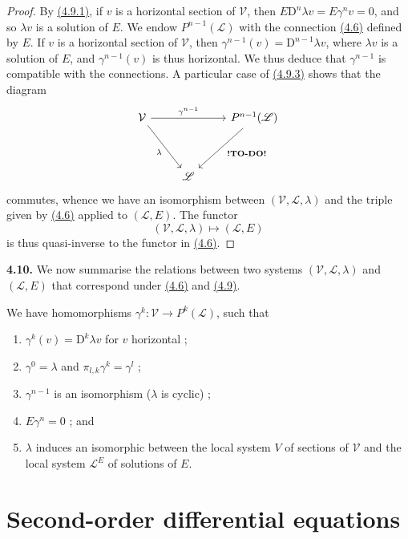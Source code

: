 \documentclass{report}
\newenvironment{rmenv}[1]
  {\phantomsection\par\medskip\noindent\textbf{#1.}\rmfamily}
  {\par\medskip}
\newcommand{\scr}[1]{{\mathscr{#1}}}
\renewcommand{\cal}[1]{{\mathcal{#1}}}
\newcommand{\DD}{\mathrm{D}}
\newcommand{\todo}{\textbf{ !TO-DO! }}
\newcommand{\oldpage}[1]{\marginpar{\footnotesize$\Big\vert$ \textit{p.~#1}}}
\begin{document}
\begin{proof}
  By \hyperref[I.4.9.1]{(4.9.1)}, if $v$ is a horizontal section of $\cal{V}$, then $E\DD^n\lambda v = E\gamma^n v = 0$, and so $\lambda v$ is a solution of $E$.
  We endow $P^{n-1}(\scr{L})$ with the connection \hyperref[I.4.6]{(4.6)} defined by $E$.
  If $v$ is a horizontal section of $\cal{V}$, then $\gamma^{n-1}(v)=\DD^{n-1}\lambda v$, where $\lambda v$ is a solution of $E$, and $\gamma^{n-1}(v)$ is thus horizontal.
  We thus deduce that $\gamma^{n-1}$ is compatible with the connections.
  A particular case of \hyperref[I.4.9.3]{(4.9.3)} shows that the diagram
  \[
    \begin{tikzcd}[row sep=huge]
      \cal{V} \ar[rr,"\gamma^{n-1}"] \drar[swap,"\lambda"]
      && P^{n-1}(\scr{L}) \dlar["\todo"]
    \\&\scr{L}&
    \end{tikzcd}
  \]
  commutes, whence we have an isomorphism between $(\cal{V},\scr{L},\lambda)$ and the triple given by \hyperref[I.4.6]{(4.6)} applied to $(\scr{L},E)$.
  The functor
  \[
    (\cal{V},\scr{L},\lambda) \mapsto (\scr{L},E)
  \]
  is thus quasi-inverse to the functor in \hyperref[I.4.6]{(4.6)}.
\end{proof}

\begin{rmenv}{4.10}
\label{I.4.10}
  We now summarise the relations between two systems $(\cal{V},\scr{L},\lambda)$ and $(\scr{L},E)$ that correspond under \hyperref[I.4.6]{(4.6)} and \hyperref[I.4.9]{(4.9)}.

  We have homomorphisms $\gamma^k\colon\cal{V}\to P^k(\scr{L})$, such that
  \begin{enumerate}
    \item[(4.10.1)]\label{I.4.10.1}
      $\gamma^k(v) = \DD^k\lambda v$ for $v$ horizontal ;
\oldpage{29}
    \item[(4.10.2)]\label{I.4.10.2}
      $\gamma^0=\lambda$ and $\pi_{l,k}\gamma^k=\gamma^l$ ;
    \item[(4.10.3)]\label{I.4.10.3}
      $\gamma^{n-1}$ is an isomorphism ($\lambda$ is cyclic) ;
    \item[(4.10.4)]\label{I.4.10.4}
      $E\gamma^n=0$ ; and
    \item[(4.10.5)]\label{I.4.10.5}
      $\lambda$ induces an isomorphic between the local system $V$ of sections of $\cal{V}$ and the local system $\scr{L}^E$ of solutions of $E$.
  \end{enumerate}
\end{rmenv}


\section{Second-order differential equations}
\label{I.5}
\end{document}
